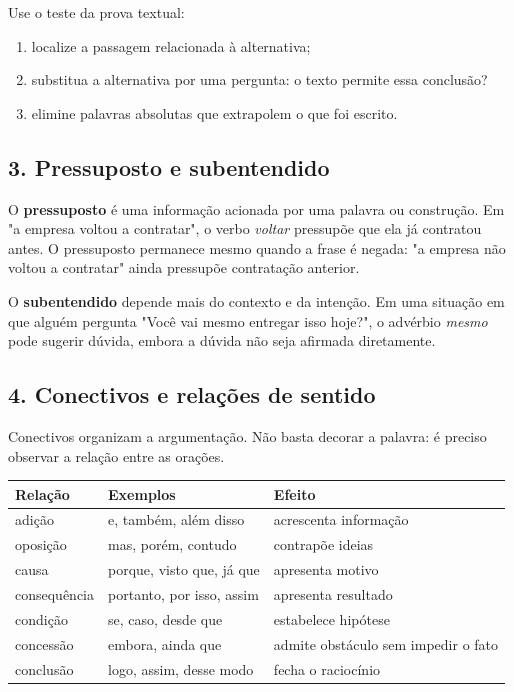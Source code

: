 \documentclass[11pt,a4paper]{article}
\begin{document}
Use o teste da prova textual:

\begin{enumerate}
  \item localize a passagem relacionada à alternativa;
  \item substitua a alternativa por uma pergunta: o texto permite essa conclusão?
  \item elimine palavras absolutas que extrapolem o que foi escrito.
\end{enumerate}

\subsection*{3. Pressuposto e subentendido}

O \textbf{pressuposto} é uma informação acionada por uma palavra ou construção. Em "a empresa voltou a contratar", o verbo \textit{voltar} pressupõe que ela já contratou antes. O pressuposto permanece mesmo quando a frase é negada: "a empresa não voltou a contratar" ainda pressupõe contratação anterior.

O \textbf{subentendido} depende mais do contexto e da intenção. Em uma situação em que alguém pergunta "Você vai mesmo entregar isso hoje?", o advérbio \textit{mesmo} pode sugerir dúvida, embora a dúvida não seja afirmada diretamente.

\subsection*{4. Conectivos e relações de sentido}

Conectivos organizam a argumentação. Não basta decorar a palavra: é preciso observar a relação entre as orações.

\begin{tabularx}{\linewidth}{llX}
\toprule
 \textbf{Relação} & \textbf{Exemplos} & \textbf{Efeito} \\
\midrule
 adição & e, também, além disso & acrescenta informação \\
 oposição & mas, porém, contudo & contrapõe ideias \\
 causa & porque, visto que, já que & apresenta motivo \\
 consequência & portanto, por isso, assim & apresenta resultado \\
 condição & se, caso, desde que & estabelece hipótese \\
 concessão & embora, ainda que & admite obstáculo sem impedir o fato \\
 conclusão & logo, assim, desse modo & fecha o raciocínio \\
\bottomrule
\end{tabularx}
\end{document}

